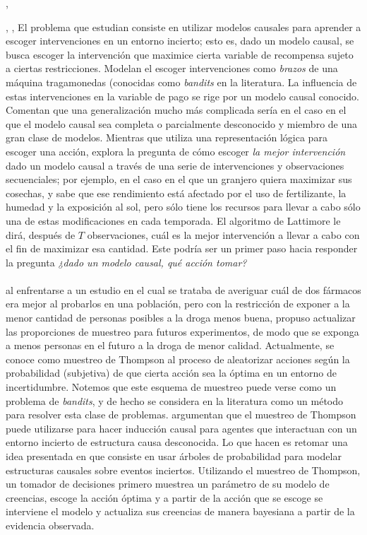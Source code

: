 \documentclass[11pt]{article}
\theoremstyle{plain}
\begin{document}
\cite{hagmayer2008causal}, 


\cite{hauser2012two}
\cite{hagmayer2013repeated}, 
\cite{agarwal2014taming}
\cite{alon2015online}, 
El problema que \cite{lattimoreNIPS2016} estudian consiste en utilizar modelos causales para aprender a escoger intervenciones en un entorno incierto; esto es, dado un modelo causal, se busca escoger la intervención que maximice cierta variable de recompensa sujeto a ciertas restricciones. Modelan el escoger intervenciones como \textit{brazos} de una máquina tragamonedas (conocidas como \textit{bandits} en la literatura. La influencia de estas intervenciones en la variable de pago se rige por un modelo causal conocido. Comentan que una generalización mucho más complicada sería en el caso en el que el modelo causal sea completa o parcialmente desconocido y miembro de una gran clase de modelos. Mientras que \cite{garnelo2016towards} utiliza una representación lógica para escoger una acción, \cite{lattimoreNIPS2016} explora la pregunta de cómo escoger \textit{la mejor intervención} dado un modelo causal a través de una serie de intervenciones y observaciones secuenciales; por ejemplo, en el caso en el que un granjero quiera maximizar sus cosechas, y sabe que ese rendimiento está afectado por el uso de fertilizante, la humedad y la exposición al sol, pero sólo tiene los recursos para llevar a cabo sólo una de estas modificaciones en cada temporada. El algoritmo de Lattimore le dirá, después de $T$ observaciones, cuál es la mejor intervención a llevar a cabo con el fin de maximizar esa cantidad. Este podría ser un primer paso hacia responder la pregunta \textit{¿dado un modelo causal, qué acción tomar?}\\
\\
\cite{thompson1933likelihood} al enfrentarse a un estudio en el cual se trataba de averiguar cuál de dos fármacos era mejor al probarlos en una población, pero con la restricción de exponer a la menor cantidad de personas posibles a la droga menos buena, propuso actualizar las proporciones de muestreo para futuros experimentos, de modo que se exponga a menos personas en el futuro a la droga de menor calidad. Actualmente, se conoce como muestreo de Thompson al proceso de aleatorizar acciones según la probabilidad (subjetiva) de que cierta acción sea la óptima en un entorno de incertidumbre. Notemos que este esquema de muestreo puede verse como un problema de \textit{bandits}, y de hecho se considera en la literatura como un método para resolver esta clase de problemas. \cite{ortega2014generalized} argumentan que el muestreo de Thompson puede utilizarse para hacer inducción causal para agentes que interactuan con un entorno incierto de estructura causa desconocida. Lo que hacen es retomar una idea presentada en \cite{ortega2011bayesian} que consiste en usar árboles de probabilidad para modelar estructuras causales sobre eventos inciertos. Utilizando el muestreo de Thompson, un tomador de decisiones primero muestrea un parámetro de su modelo de creencias, escoge la acción óptima y a partir de la acción que se escoge se interviene el modelo y actualiza sus creencias de manera bayesiana a partir de la evidencia observada.
\end{document}
